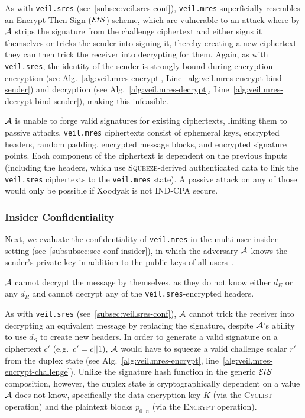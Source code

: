 As with \texttt{veil.sres} (see~\ref{subsec:veil.sres-conf}), \texttt{veil.mres} superficially resembles an
Encrypt-Then-Sign ($\mathcal{E}t\mathcal{S}$) scheme, which are vulnerable to an attack where by $\mathcal{A}$ strips the signature from the
challenge ciphertext and either signs it themselves or tricks the sender into signing it, thereby creating a new
ciphertext they can then trick the receiver into decrypting for them.
Again, as with \texttt{veil.sres}, the identity of the sender is strongly bound during encryption
encryption (see Alg.~\ref{alg:veil.mres-encrypt}, Line~\ref{alg:veil.mres-encrypt-bind-sender}) and decryption
(see Alg.~\ref{alg:veil.mres-decrypt}, Line~\ref{alg:veil.mres-decrypt-bind-sender}), making this infeasible.

$\mathcal{A}$ is unable to forge valid signatures for existing ciphertexts, limiting them to passive attacks.
\texttt{veil.mres} ciphertexts consist of ephemeral keys, encrypted headers, random padding, encrypted message blocks,
and encrypted signature points.
Each component of the ciphertext is dependent on the previous inputs (including the headers, which use
\textsc{Squeeze}-derived authenticated data to link the \texttt{veil.sres} ciphertexts to the \texttt{veil.mres} state).
A passive attack on any of those would only be possible if Xoodyak is not IND-CPA secure.

\subsubsection{Insider Confidentiality}

Next, we evaluate the confidentiality of \texttt{veil.mres} in the multi-user insider setting
(see~\ref{subsubsec:sec-conf-insider}), in which the adversary $\mathcal{A}$ knows the sender's private key in addition
to the public keys of all users~\cite[p. 45--46]{baek2010}.

$\mathcal{A}$ cannot decrypt the message by themselves, as they do not know either $d_E$ or any $d_R$ and cannot decrypt
any of the \texttt{veil.sres}-encrypted headers.

As with \texttt{veil.sres} (see~\ref{subsec:veil.sres-conf}),
$\mathcal{A}$ cannot trick the receiver into decrypting an equivalent message by replacing the signature, despite
$\mathcal{A}$'s ability to use $d_S$ to create new headers.
In order to generate a valid signature on a ciphertext $c'$ (e.g.\ $c'=c||1$), $\mathcal{A}$ would have to squeeze a
valid challenge scalar $r'$ from the duplex state (see Alg.~\ref{alg:veil.mres-encrypt},
line~\ref{alg:veil.mres-encrypt-challenge}).
Unlike the signature hash function in the generic $\mathcal{E}t\mathcal{S}$ composition, however, the duplex state is cryptographically
dependent on a value $\mathcal{A}$ does not know, specifically the data encryption key $K$ (via the \textsc{Cyclist}
operation) and the plaintext blocks $p_{0..n}$ (via the \textsc{Encrypt} operation).

